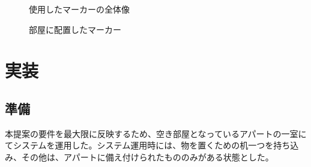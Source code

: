 \begin{figure}[htbp]
  \begin{minipage}{0.3\hsize}
    \begin{center}
    \end{center}
    \caption{使用したマーカーの全体像}
  \end{minipage}
  \begin{minipage}{0.7\hsize}
    \begin{center}
    \end{center}
    \caption{部屋に配置したマーカー}
  \end{minipage}
\end{figure}


\section{実装}

\subsection{準備}

本提案の要件を最大限に反映するため、空き部屋となっているアパートの一室にてシステムを運用した。システム運用時には、物を置くための机一つを持ち込み、その他は、アパートに備え付けられたもののみがある状態とした。

